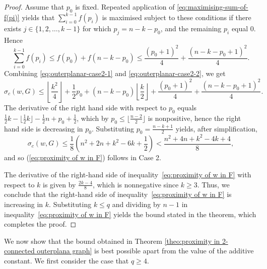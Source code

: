 \documentclass[a4paper,11pt]{article}
\numberwithin{equation}{theorem}
\begin{document}
\begin{proof}
Assume that $p_0$ is fixed.  
Repeated application of \eqref{eq:maximising-sum-of-f(pi)} 
yields that $\sum_{i=0}^{k-1} f(p_i)$ is maximised subject to these conditions if there exists
$j\in \{1,2,\ldots,k-1\}$ for which $p_j=n-k-p_0$, and the remaining $p_i$ equal $0$. Hence
\begin{equation} \label{eq:outerplanar-case2-2}
 \sum_{i=0}^{k-1} f(p_i) \leq f(p_0) + f(n-k-p_0)
    \leq \frac{(p_0+1)^2}{4} + \frac{(n-k-p_0+1)^2}{4}. 
\end{equation}    
Combining \eqref{eq:outerplanar-case2-1} and \eqref{eq:outerplanar-case2-2}, we get
\begin{equation}
\sigma_c(w,G) \leq  \left\lfloor \frac{k^2}{4} \right\rfloor 
           + \frac{1}{2}p_0 + (n-k-p_0)  \left\lfloor \frac{k}{2} \right\rfloor
           + \frac{(p_0+1)^2}{4} + \frac{(n-k-p_0+1)^2}{4}.
\end{equation}
The derivative of the right hand side with respect to $p_0$ equals 
$\frac{1}{2}k - \lfloor \frac{1}{2}k \rfloor - \frac{1}{2}n + p_0 + \frac{1}{2}$, which by 
$p_0 \leq \lfloor \frac{n-2}{2} \rfloor$ is nonpositive, hence the right hand side is 
decreasing in $p_0$. Substituting $p_0=\frac{n-k+1}{2}$ yields, after simplification, 
\[ \sigma_c(w,G) \leq \frac{1}{8}(n^2 + 2n + k^2 - 6k+ \frac{1}{2}) < \frac{n^2+4n + k^2 - 4k +4}{8},\]
and so (\ref{eq:proximity of w in F}) follows in Case 2.

The derivative of the right-hand side of inequality~\eqref{eq:proximity of w in F} with respect to 
$k$ is given by $\frac{2k - 4}{8}$, which is nonnegative since $k \geq 3$. Thus, we conclude that 
the right-hand side of inequality~\eqref{eq:proximity of w in F} is increasing in $k$. Substituting 
$k \leq q$ and dividing by $n - 1$ in inequality~\eqref{eq:proximity of w in F} yields the bound 
stated in the theorem, which completes the proof.
\end{proof}

We now show that the bound obtained in Theorem \ref{theo:proximity in 2-connected outerplana graph} is best possible apart from the value of the additive constant. We first consider the case that 
$q\geq 4$. 
\end{document}
